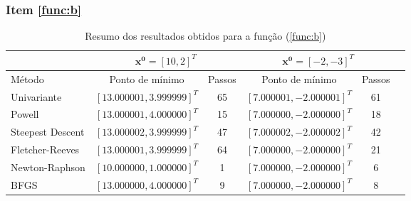 \documentclass[10pt, a4paper]{article}
\begin{document}
\subsubsection{Item \ref{func:b}}

\begin{table}[htpb]
  \centering
  \begin{tabular}{|l|c|c|c|c|c|}
    \cline{2-5}
    \multicolumn{1}{c}{} \vline
    & 
    \multicolumn{2}{c}{$\mathbf{x^0} = [10, 2]^T$} \vline
    & 
    \multicolumn{2}{c}{$\mathbf{x^0} = [-2, -3]^T$} \vline \\
    \hline%
    Método             &	Ponto de mínimo	          & Passos	&  Ponto de mínimo	          &  Passos   \\
    \hline
    Univariante        & $[13.000001, 3.999999]^T$ & 65      &  $[7.000001, -2.000001]^T$ &  61       \\
    Powell             & $[13.000001, 4.000000]^T$ & 15      &  $[7.000000, -2.000000]^T$ &  18       \\
    Steepest Descent   & $[13.000002, 3.999999]^T$ & 47      &  $[7.000002, -2.000002]^T$ &  42       \\
    Fletcher-Reeves    & $[13.000001, 3.999999]^T$ & 64      &  $[7.000000, -2.000000]^T$ &  21       \\
    Newton-Raphson     & $[10.000000, 1.000000]^T$ & 1       &  $[7.000000, -2.000000]^T$ &  6        \\
    BFGS               & $[13.000000, 4.000000]^T$ & 9       &  $[7.000000, -2.000000]^T$ &  8        \\
    \hline
  \end{tabular}
  \caption{Resumo dos resultados obtidos para a função (\ref{func:b})}
  \label{tab:q1b_results}
\end{table}
\end{document}
